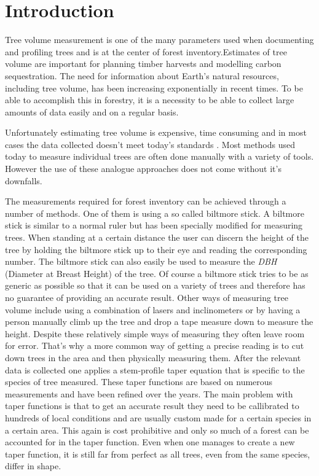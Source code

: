 

\newcommand{\degree}{$^\circ$}

\section{Introduction}
Tree volume measurement is one of the many parameters used when documenting and profiling trees and is at the center of forest inventory.Estimates of tree volume are important for planning timber harvests and modelling carbon sequestration. The need for information about Earth's natural resources, including tree volume, has been increasing exponentially in recent times. To be able to accomplish this in forestry, it is a necessity to be able to collect large amounts of data easily and on a regular basis. 

Unfortunately estimating tree volume is expensive, time consuming and in most cases the data collected doesn't meet today's standards \cite{digital imaged based tree measurement for forest inventory}.
Most methods used today to measure individual trees are often done manually with a variety of tools. However the use of these analogue approaches does not come without it's downfalls.

The measurements required for forest inventory can be achieved through a number of methods. One of them is using a so called biltmore stick. A biltmore stick is similar to a normal ruler but has been specially modified for measuring trees. When standing at a certain distance the user can discern the height of the tree by holding the biltmore stick up to their eye and reading the corresponding number. The biltmore stick can also easily be used to measure the \emph{DBH} (Diameter at Breast Height) of the tree. Of course a biltmore stick tries to be as generic as possible so that it can be used on a variety of trees and therefore has no guarantee of providing an accurate result. Other ways of measuring tree volume include using a combination of lasers and inclinometers or by having a person manually climb up the tree and drop a tape measure down to measure the height. Despite these relatively simple ways of measuring they often leave room for error. That’s why a more common way of getting a precise reading is to cut down trees in the area and then physically measuring them. After the relevant data is collected one applies a stem-profile taper equation that is specific to the species of tree measured. These taper functions are based on numerous measurements and have been refined over the years. The main problem with taper functions is that to get an accurate result they need to be callibrated to hundreds of local conditions and are usually custom made for a certain species in a certain area. This again is cost prohibitive and only so much of a forest can be accounted for in the taper function. Even when one manages to create a new taper function, it is still far from perfect as all trees, even from the same species, differ in shape.

